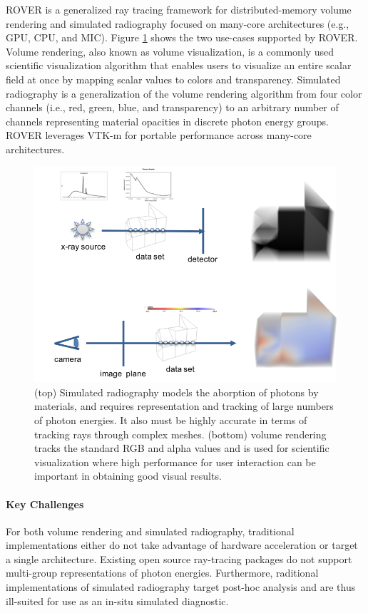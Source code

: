 ROVER is a generalized ray tracing framework for distributed-memory volume
rendering and simulated radiography \cite{rover-laney} focused on many-core architectures (e.g.,
GPU, CPU, and MIC).  Figure \ref{fig:rover-overview} shows the two use-cases
supported by ROVER. Volume rendering, also known as volume visualization, is a
commonly used scientific visualization algorithm that enables users to
visualize an entire scalar field at once by mapping scalar values to colors and
transparency.  Simulated radiography is a generalization of the volume
rendering algorithm from four color channels (i.e., red, green, blue, and
transparency) to an arbitrary number of channels representing material
opacities in discrete photon energy groups. ROVER leverages VTK-m
\cite{rover-vtkm} for portable performance across many-core architectures. 
\begin{figure}[htb]
	\centering
	\includegraphics[width=6in]{ROVER}
	\caption{\label{fig:rover-overview} (top) Simulated radiography models
the aborption of photons by materials, and requires representation and tracking
of large numbers of photon energies. It also must be highly accurate in terms
of tracking rays through complex meshes. (bottom) volume rendering tracks the
standard RGB and alpha values and is used for scientific visualization where
high performance for user interaction can be important in obtaining good visual
results.} \end{figure}


\paragraph{Key Challenges}
For both volume rendering and simulated radiography, traditional
implementations either do not take advantage of hardware acceleration or
target a single architecture. Existing open source ray-tracing packages do not
support multi-group representations of photon energies.  Furthermore,
raditional implementations of simulated radiography target post-hoc analysis
and are thus ill-suited for use as an in-situ simulated diagnostic. 

